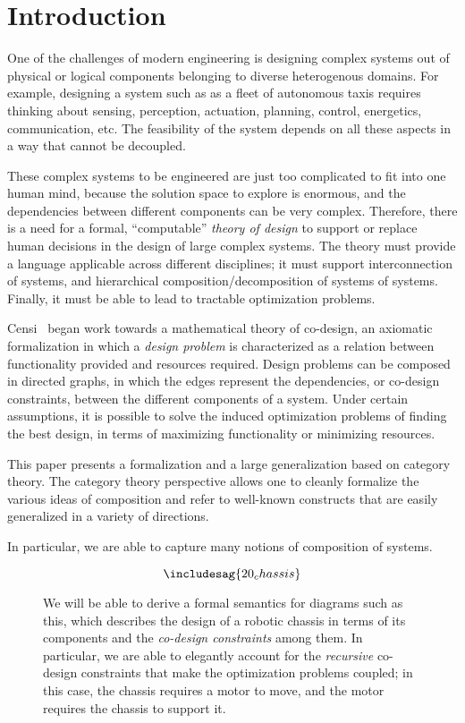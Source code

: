 \section{Introduction}

One of the challenges of modern engineering is designing complex systems out
of physical or logical components belonging to diverse heterogenous domains.
For example, designing a system such as as a fleet of autonomous taxis
requires thinking about sensing, perception, actuation, planning, control,
energetics, communication, etc. The feasibility of the system depends on all
these aspects in a way that cannot be decoupled.

These complex systems to be engineered are just too complicated to
fit into one human mind, because the solution space to explore is enormous,
and the dependencies between different components can be very complex.
Therefore, there is a need for a formal, ``computable'' \emph{theory of design} to
support or replace human decisions in the design of large complex systems.
The theory must provide a language applicable across different disciplines;
it  must support interconnection of systems, and hierarchical composition/decomposition of systems of systems. Finally,
it must be able to lead to tractable optimization problems.

Censi~\cite{Censi2017} began work towards a mathematical theory of co-design,
an axiomatic formalization in which a \emph{design problem} is characterized
as a relation between functionality provided and resources required. Design
problems can be composed in directed graphs, in which the edges represent
the dependencies, or co-design constraints, between the different components
of a system. Under certain assumptions, it is possible to solve the induced
optimization problems of finding the best design, in terms of maximizing
functionality or minimizing resources.

This paper presents a formalization and a large generalization based on
category theory. The category theory perspective allows one to cleanly
formalize the various ideas of composition and refer to well-known
constructs that are easily generalized in a variety of directions.

In particular, we are able to capture many notions of composition
of systems.



\begin{figure}[h!]
    \begin{equation}\label{eqn:chassis}
    \includesag{20_chassis}
    \end{equation}
    \caption{
    We will be able to derive a formal semantics for
    diagrams such as this, which describes the design of a robotic
    chassis in terms of its components and the \emph{co-design constraints} among
    them. In particular, we are able to elegantly account for the
    \emph{recursive} co-design constraints that make the optimization problems
    coupled; in this case, the chassis requires a motor to move, and the motor
    requires the chassis to support it.
    }
\end{figure}


